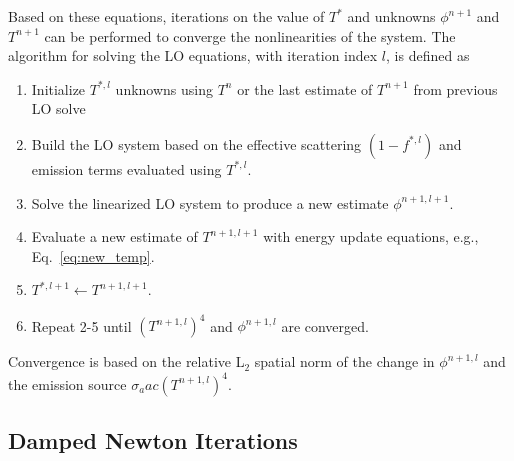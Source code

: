 Based on these equations, iterations on the value of $T^*$ and unknowns $\phi^{n+1}$ and $T^{n+1}$ can be performed to converge the nonlinearities of the system. The algorithm for solving the LO equations, with iteration index
$l$, is defined as
\begin{enumerate}
    \item Initialize $T^{*,l}$ unknowns using $T^n$ or the last estimate of $T^{n+1}$ from
        previous LO solve
    \item  Build the LO system based on the effective scattering $(1-f^{*,l})$ and emission terms
        evaluated using $T^{*,l}$.
    \item Solve the linearized LO system to produce a new estimate $\phi^{n+1,l+1}$.
    \item Evaluate a new estimate of $T^{n+1,l+1}$ with energy update equations, e.g., Eq.~\eqref{eq:new_temp}.
    \item $T^{*,l+1}\leftarrow{T}^{n+1,l+1}$.
    \item Repeat 2-5 until $(T^{n+1,l})^4$ and $\phi^{n+1,l}$ are converged.
\end{enumerate}
Convergence is based on the relative L$_2$ spatial norm of the change in $\phi^{n+1,l}$
and the emission source $\sigma_a a c \left(T^{n+1,l}\right)^4$.

\subsection{Damped Newton Iterations}
\label{app:damped_newton}

